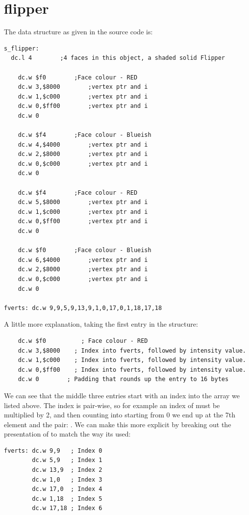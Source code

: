 \chapter{flipper}
\label{sec:listing}
\lstset{style=68KStyle}

The data structure as given in the source code is:

\begin{lstlisting}
s_flipper: 
  dc.l 4		;4 faces in this object, a shaded solid Flipper

	dc.w $f0		;Face colour - RED
	dc.w 3,$8000		;vertex ptr and i
	dc.w 1,$c000		;vertex ptr and i
	dc.w 0,$ff00		;vertex ptr and i
	dc.w 0

	dc.w $f4		;Face colour - Blueish
	dc.w 4,$4000		;vertex ptr and i
	dc.w 2,$8000		;vertex ptr and i
	dc.w 0,$c000		;vertex ptr and i
	dc.w 0

	dc.w $f4		;Face colour - RED
	dc.w 5,$8000		;vertex ptr and i
	dc.w 1,$c000		;vertex ptr and i
	dc.w 0,$ff00		;vertex ptr and i
	dc.w 0

	dc.w $f0		;Face colour - Blueish
	dc.w 6,$4000		;vertex ptr and i
	dc.w 2,$8000		;vertex ptr and i
	dc.w 0,$c000		;vertex ptr and i
	dc.w 0

fverts: dc.w 9,9,5,9,13,9,1,0,17,0,1,18,17,18
\end{lstlisting}

A little more explanation, taking the first entry in the structure:
\begin{lstlisting}
	dc.w $f0		  ; Face colour - RED
	dc.w 3,$8000	; Index into fverts, followed by intensity value.
	dc.w 1,$c000	; Index into fverts, followed by intensity value.
	dc.w 0,$ff00	; Index into fverts, followed by intensity value.
	dc.w 0        ; Padding that rounds up the entry to 16 bytes
\end{lstlisting}

We can see that the middle three entries start with an index into the array  we listed above.
The index is pair-wise, so for example an index of  must be multiplied by 2, and then counting into 
starting from 0 we end up at the 7th element and the pair: . We can make this more explicit by breaking out the
presentation of  to match the way its used:
\begin{lstlisting}
fverts: dc.w 9,9   ; Index 0
        dc.w 5,9   ; Index 1
        dc.w 13,9  ; Index 2
        dc.w 1,0   ; Index 3
        dc.w 17,0  ; Index 4
        dc.w 1,18  ; Index 5
        dc.w 17,18 ; Index 6
\end{lstlisting}

